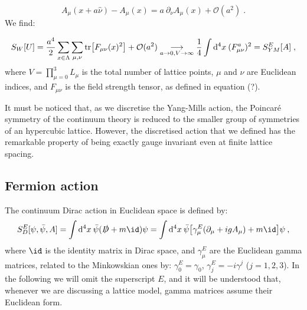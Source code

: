 \begin{equation}
A_{\mu}(x + a \hat \nu) - A_{\mu}(x) = a \: \partial_{\nu} A_{\mu}(x) + \mathcal{O}(a^2) \; .
\end{equation}
%
We find:

\begin{equation}
S_W[U] = \frac{a^4}{2} \sum_{x \in \Lambda} \sum_{\mu, \nu} \tr [F_{\mu \nu}(x)^2]  + \mathcal O(a^2) \underset{a \to 0, V \to \infty}{\longrightarrow} \frac{1}{4} \int \mathrm{d}^4x \: (F_{\mu \nu}^a)^2 = S_{YM}^E[A]\; ,
\end{equation}
%
where $V = \prod_{\mu = 0}^3L_{\mu}$ is the total number of lattice points, $\mu$ and $\nu$ are Euclidean indices, and $F_{\mu \nu}$ is the field strength tensor, as defined in equation {\color{red}(?)}.

It must be noticed that, as we discretise the Yang-Mills action, the Poincaré symmetry of the continuum theory is reduced to the smaller group of symmetries of an hypercubic lattice. However, the discretised action that we defined has the remarkable property of being exactly gauge invariant even at finite lattice spacing.



\subsection{Fermion action}
\label{fermion_action}

The continuum Dirac action in Euclidean space is defined by:
\begin{equation}
S_D^E[\psi, \bar \psi, A] = \int \dx  \: \bar \psi (\slashed D + m \id) \psi = \int \dx \: \bar \psi \bigl[ \gamma_{\mu}^E(\partial_{\mu} + i g A_{\mu}) + m \id \bigr] \psi \: ,
\end{equation}
%
where $\id$ is the identity matrix in Dirac space, and $\gamma_{\mu}^E$ are the Euclidean gamma matrices, related to the Minkowskian ones by: $\gamma_0^E = \gamma_0$, $\gamma_j^E = - i \gamma^j$ ($j = 1,2,3$). In the following we will omit the superscript $E$, and it will be understood that, whenever we are discussing a lattice model, gamma matrices assume their Euclidean form.

